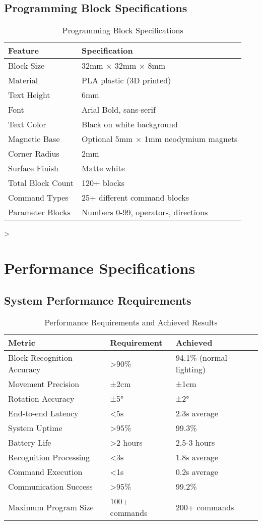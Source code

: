 \subsection{Programming Block Specifications}

\begin{table}[H]
\centering
\caption{Programming Block Specifications}
\begin{tabular}{|l|l|}
\hline
\textbf{Feature} & \textbf{Specification} \\
\hline
Block Size & 32mm × 32mm × 8mm \\
Material & PLA plastic (3D printed) \\
Text Height & 6mm \\
Font & Arial Bold, sans-serif \\
Text Color & Black on white background \\
Magnetic Base & Optional 5mm × 1mm neodymium magnets \\
Corner Radius & 2mm \\
Surface Finish & Matte white \\
Total Block Count & 120+ blocks \\
Command Types & 25+ different command blocks \\
Parameter Blocks & Numbers 0-99, operators, directions \\
\hline
\end{tabular}
\label{tab:blocks}
\end{table}>

\section{Performance Specifications}

\subsection{System Performance Requirements}

\begin{table}[H]
\centering
\caption{Performance Requirements and Achieved Results}
\begin{tabular}{|l|l|l|}
\hline
\textbf{Metric} & \textbf{Requirement} & \textbf{Achieved} \\
\hline
Block Recognition Accuracy & >90\% & 94.1\% (normal lighting) \\
Movement Precision & ±2cm & ±1cm \\
Rotation Accuracy & ±5° & ±2° \\
End-to-end Latency & <5s & 2.3s average \\
System Uptime & >95\% & 99.3\% \\
Battery Life & >2 hours & 2.5-3 hours \\
Recognition Processing & <3s & 1.8s average \\
Command Execution & <1s & 0.2s average \\
Communication Success & >95\% & 99.2\% \\
Maximum Program Size & 100+ commands & 200+ commands \\
\hline
\end{tabular}
\label{tab:performance}
\end{table}

